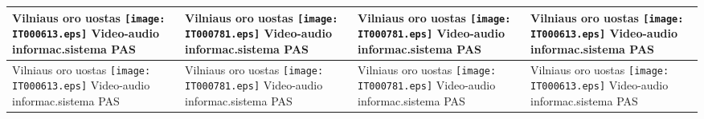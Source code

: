 \documentclass[a4paper,12pt]{article}
\begin{document}
 \tabletail{\hline}
\begin{supertabular}{|p{4.2cm}|p{4.2cm}|p{4.2cm}|p{4.2cm}|} \hline
Vilniaus oro uostas \newline \texttt{[image: IT000613.eps]} \newline Video-audio informac.sistema \newline \footnotesize {PAS} & Vilniaus oro uostas \newline \texttt{[image: IT000781.eps]} \newline Video-audio informac.sistema \newline \footnotesize {PAS} & Vilniaus oro uostas \newline \texttt{[image: IT000781.eps]} \newline Video-audio informac.sistema \newline \footnotesize {PAS} & Vilniaus oro uostas \newline \texttt{[image: IT000613.eps]} \newline Video-audio informac.sistema \newline \footnotesize {PAS} \\\hline
Vilniaus oro uostas \newline \texttt{[image: IT000613.eps]} \newline Video-audio informac.sistema \newline \footnotesize {PAS} & Vilniaus oro uostas \newline \texttt{[image: IT000781.eps]} \newline Video-audio informac.sistema \newline \footnotesize {PAS} & Vilniaus oro uostas \newline \texttt{[image: IT000781.eps]} \newline Video-audio informac.sistema \newline \footnotesize {PAS} & Vilniaus oro uostas \newline \texttt{[image: IT000613.eps]} \newline Video-audio informac.sistema \newline \footnotesize {PAS} \\\hline

\end{supertabular}
\end{document}

